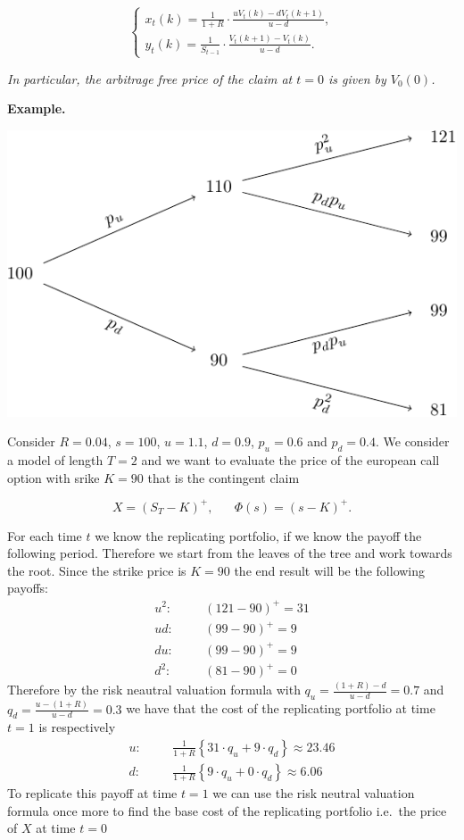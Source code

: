 \documentclass[a4paper,12pt,openany]{book}
\begin{document}
\[
\left\{\begin{matrix}x_t(k)=\frac{1}{1+R}\cdot\frac{uV_t(k)-dV_t(k+1)}{u-d},\\ y_t(k)=\frac{1}{S_{t-1}}\cdot\frac{V_t(k+1)-V_t(k)}{u-d}.\end{matrix}\right.
\]

\emph{In particular, the arbitrage free price of the claim at \(t=0\) is given by \(V_0(0)\).}

\textbf{Example.}

\begin{center}\includegraphics[width=0.75\linewidth]{theory_files/figure-latex/unnamed-chunk-1-1} \end{center}

Consider \(R=0.04\), \(s=100\), \(u=1.1\), \(d=0.9\), \(p_u=0.6\) and \(p_d=0.4\). We consider a model of length \(T=2\) and we want to evaluate the price of the european call option with srike \(K=90\) that is the contingent claim

\[
X=(S_T-K)^+,\hspace{20pt}\Phi(s)=(s-K)^+.
\]

For each time \(t\) we know the replicating portfolio, if we know the payoff the following period. Therefore we start from the leaves of the tree and work towards the root. Since the strike price is \(K=90\) the end result will be the following payoffs:
\begin{align*}
u^2:\hspace{20pt}&(121-90)^+=31\\
ud:\hspace{20pt}&(99-90)^+=9\\
du:\hspace{20pt}&(99-90)^+=9\\
d^2:\hspace{20pt}&(81-90)^+=0
\end{align*}
Therefore by the risk neautral valuation formula with \(q_u=\frac{(1+R)-d}{u-d}=0.7\) and \(q_d=\frac{u-(1+R)}{u-d}=0.3\) we have that the cost of the replicating portfolio at time \(t=1\) is respectively
\begin{align*}
u:\hspace{20pt}&\frac{1}{1+R}\left\{31\cdot q_u + 9 \cdot q_d\right\}\approx 23.46\\
d:\hspace{20pt}&\frac{1}{1+R}\left\{9\cdot q_u + 0 \cdot q_d\right\}\approx 6.06
\end{align*}
To replicate this payoff at time \(t=1\) we can use the risk neutral valuation formula once more to find the base cost of the replicating portfolio i.e.~the price of \(X\) at time \(t=0\)
\end{document}
